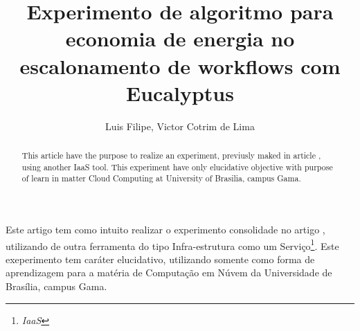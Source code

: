 \documentclass[12pt]{article}
\title{Experimento de algoritmo para economia de energia no\\
 escalonamento de workflows com Eucalyptus}
\author{Luis Filipe\inst{1}, Victor Cotrim de Lima\inst{1}}
\begin{document}
\maketitle

\begin{abstract}
  This article have the purpose to realize an experiment, previusly maked in article \cite{elaine_et_al:14}, using another IaaS tool. This experiment have only elucidative objective with purpose of learn in matter Cloud Computing at University of Brasilia, campus Gama.
\end{abstract}

\begin{resumo}
  Este artigo tem como intuito realizar o experimento consolidade no artigo \cite{elaine_et_al:14}, utilizando de outra ferramenta do tipo Infra-estrutura como um Serviço\footnote{\textit{IaaS}}. Este exeperimento tem caráter elucidativo, utilizando somente como forma de aprendizagem para a matéria de Computação em Núvem da Universidade de Brasília, campus Gama.

\end{resumo}







\end{document}
